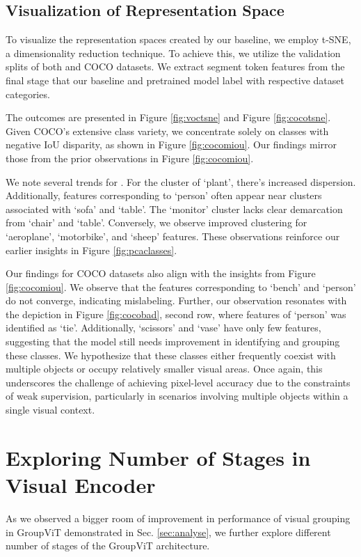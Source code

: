 \subsection{Visualization of Representation Space}
To visualize the representation spaces created by our baseline, we employ t-SNE\cite{van2008visualizing}, a dimensionality reduction technique. To achieve this, we utilize the validation splits of both  \pvoc and COCO datasets. We extract segment token features from the final stage that our baseline and pretrained model label with respective dataset categories.

The outcomes are presented in Figure \ref{fig:voctsne} and Figure \ref{fig:cocotsne}. Given COCO's extensive class variety, we concentrate solely on classes with negative IoU disparity, as shown in Figure \ref{fig:cocomiou}. Our findings mirror those from the prior observations in Figure \ref{fig:cocomiou}.

We note several trends for \pvoc. For the cluster of `plant', there's increased dispersion. Additionally, features corresponding to `person' often appear near clusters associated with `sofa' and `table'. The `monitor' cluster lacks clear demarcation from `chair' and `table'. Conversely, we observe improved clustering for `aeroplane', `motorbike', and `sheep' features. These observations reinforce our earlier insights in Figure \ref{fig:pcaclasses}.

Our findings for COCO datasets also align with the insights from Figure \ref{fig:cocomiou}. We observe that the features corresponding to `bench' and `person' do not converge, indicating mislabeling. Further, our observation resonates with the depiction in Figure \ref{fig:cocobad}, second row, where features of `person' was identified as `tie'. Additionally, `scissors' and `vase' have only few features, suggesting that the model still needs improvement in identifying and grouping these classes. We hypothesize that these classes either frequently coexist with multiple objects or occupy relatively smaller visual areas. Once again, this underscores the challenge of achieving pixel-level accuracy due to the constraints of weak supervision, particularly in scenarios involving multiple objects within a single visual context.


\section{Exploring Number of Stages in Visual Encoder}
As we observed a bigger room of improvement in performance of visual grouping in GroupViT demonstrated in Sec. \ref{sec:analyse}, we further explore different number of stages of the GroupViT architecture. \\
